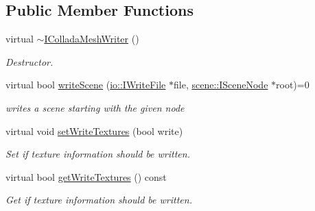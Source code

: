 \subsection*{Public Member Functions}
\begin{DoxyCompactItemize}
\item 
\mbox{\label{classirr_1_1scene_1_1IColladaMeshWriter_a85ed9eb856663c6698e1f7c4535b9057}} 
virtual \hyperlink{classirr_1_1scene_1_1IColladaMeshWriter_a85ed9eb856663c6698e1f7c4535b9057}{$\sim$\+I\+Collada\+Mesh\+Writer} ()
\begin{DoxyCompactList}\small\item\em Destructor. \end{DoxyCompactList}\item 
\mbox{\label{classirr_1_1scene_1_1IColladaMeshWriter_ad2e6e7617052c83d5f19d7811e0d5fd7}} 
virtual bool \hyperlink{classirr_1_1scene_1_1IColladaMeshWriter_ad2e6e7617052c83d5f19d7811e0d5fd7}{write\+Scene} (\hyperlink{classirr_1_1io_1_1IWriteFile}{io\+::\+I\+Write\+File} $\ast$file, \hyperlink{classirr_1_1scene_1_1ISceneNode}{scene\+::\+I\+Scene\+Node} $\ast$root)=0
\begin{DoxyCompactList}\small\item\em writes a scene starting with the given node \end{DoxyCompactList}\item 
\mbox{\label{classirr_1_1scene_1_1IColladaMeshWriter_a2fa67e9fcfefdc6cf71d682e9891d15e}} 
virtual void \hyperlink{classirr_1_1scene_1_1IColladaMeshWriter_a2fa67e9fcfefdc6cf71d682e9891d15e}{set\+Write\+Textures} (bool write)
\begin{DoxyCompactList}\small\item\em Set if texture information should be written. \end{DoxyCompactList}\item 
\mbox{\label{classirr_1_1scene_1_1IColladaMeshWriter_a55088db1ff55ebb1a657fac22f52386b}} 
virtual bool \hyperlink{classirr_1_1scene_1_1IColladaMeshWriter_a55088db1ff55ebb1a657fac22f52386b}{get\+Write\+Textures} () const
\begin{DoxyCompactList}\small\item\em Get if texture information should be written. \end{DoxyCompactList}\item 

\end{DoxyCompactItemize}
